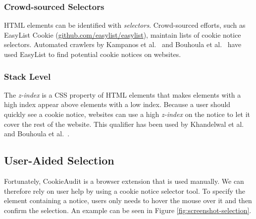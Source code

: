 \subsubsection{Crowd-sourced Selectors}
HTML elements can be identified with \emph{selectors}. 
Crowd-sourced efforts, such as EasyList Cookie (\href{https://github.com/easylist/easylist}{github.com/easylist/easylist}), maintain lists of cookie notice selectors.
Automated crawlers by Kampanos et al.~\cite{kampanos2021accept} and Bouhoula et al.~\cite{bouhoula2023automated} have used EasyList to find potential cookie notices on websites.

\subsubsection{Stack Level}
The \emph{z-index} is a CSS property of HTML elements that makes elements with a high index appear above elements with a low index. 
Because a user should quickly see a cookie notice, websites can use a high \emph{z-index} on the notice to let it cover the rest of the website. 
This qualifier has been used by Khandelwal et al.~\cite{khandelwal2023automated} and Bouhoula et al.~\cite{bouhoula2023automated}.

\subsection{User-Aided Selection}
Fortunately, CookieAudit is a browser extension that is used manually.
We can therefore rely on user help by using a cookie notice selector tool.
To specify the element containing a notice, users only needs to hover the mouse over it and then confirm the selection. 
An example can be seen in Figure \ref{fig:screenshot-selection}.

